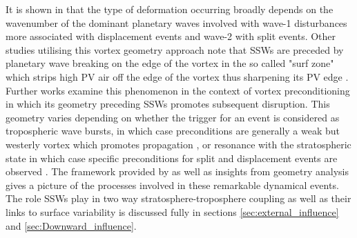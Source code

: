 It is shown in \cite{Seviour2013} that the type of deformation occurring broadly depends on the wavenumber of the dominant planetary waves involved with wave-1 disturbances more associated with displacement events and wave-2 with split events. Other studies utilising this vortex geometry approach note that SSWs are preceded by planetary wave breaking on the edge of the vortex in the so called "surf zone" which strips high PV air off the edge of the vortex thus sharpening its PV edge \citep{mcintyreBreaking1983}. Further works examine this phenomenon in the context of vortex preconditioning in which its geometry preceding SSWs promotes subsequent disruption. This geometry varies depending on whether the trigger for an event is considered as tropospheric wave bursts, in which case preconditions are generally a weak but westerly vortex which promotes propagation \citep{nishiiModulations2009b, kuttippurathComparative2012b}, or resonance with the stratospheric state in which case specific preconditions for split and displacement events are observed \citep{charltonNew2007c, bancalaPreconditioning2012b}. The framework provided by \cite{matsunoDynamical1971b} as well as insights from geometry analysis gives a picture of the processes involved in these remarkable dynamical events. The role SSWs play in two way stratosphere-troposphere coupling as well as their links to surface variability is discussed fully in sections \ref{sec:external_influence} and \ref{sec:Downward_influence}.

